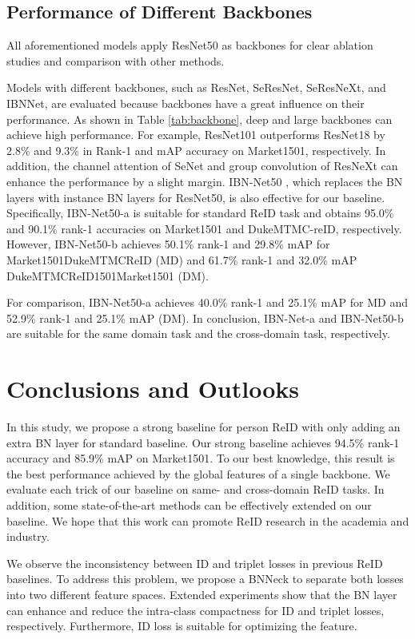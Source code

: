 \documentclass[journal]{IEEEtran}
\begin{document}
\subsection{Performance of Different Backbones}

All aforementioned models apply ResNet50 as backbones for clear ablation studies and comparison with other methods.

Models with different backbones, such as ResNet, SeResNet, SeResNeXt, and IBNNet, are evaluated because backbones have a great influence on their performance.
As shown in Table \ref{tab:backbone}, deep and large backbones can achieve high performance. For example, ResNet101 outperforms ResNet18 by 2.8\% and 9.3\% in Rank-1 and mAP accuracy on Market1501, respectively.
In addition, the channel attention of SeNet and group convolution of ResNeXt can enhance the performance by a slight margin.
IBN-Net50 \cite{pan2018two}, which replaces the BN layers with instance BN layers for ResNet50, is also effective for our baseline.
Specifically, IBN-Net50-a is suitable for standard ReID task and obtains 95.0\% and 90.1\% rank-1 accuracies on Market1501 and DukeMTMC-reID, respectively.
However, IBN-Net50-b achieves 50.1\% rank-1 and 29.8\% mAP for Market1501DukeMTMCReID (MD) and 61.7\% rank-1 and 32.0\% mAP DukeMTMCReID1501Market1501 (DM).

For comparison, IBN-Net50-a achieves 40.0\% rank-1 and 25.1\% mAP for MD and 52.9\% rank-1 and 25.1\% mAP (DM). In conclusion, IBN-Net-a and IBN-Net50-b are suitable for the same domain task and the cross-domain task, respectively.


\section{Conclusions and Outlooks}

In this study, we propose a strong baseline for person ReID with only adding an extra BN layer for standard baseline. Our strong baseline achieves 94.5\% rank-1 accuracy and 85.9\% mAP on Market1501. To our best knowledge, this result is the best performance achieved by the global features of a single backbone. We evaluate each trick of our baseline on same- and cross-domain ReID tasks. In addition, some state-of-the-art methods can be effectively extended on our baseline. We hope that this work can promote ReID research in the academia and industry.

We observe the inconsistency between ID and triplet losses in previous ReID baselines. To address this problem, we propose a BNNeck to separate both losses into two different feature spaces. Extended experiments show that the BN layer can enhance and reduce the intra-class compactness for ID and triplet losses, respectively. Furthermore, ID loss is suitable for optimizing the feature.
\end{document}
